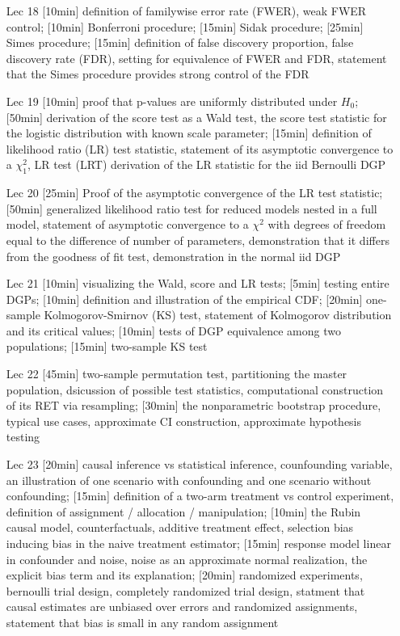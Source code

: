 \begin{enumerate}
\item[Lec 18] [10min] definition of familywise error rate (FWER), weak FWER control; [10min] Bonferroni procedure; [15min] Sidak procedure; [25min] Simes procedure; [15min] definition of false discovery proportion, false discovery rate (FDR), setting for equivalence of FWER and FDR, statement that the Simes procedure provides strong control of the FDR

\item[Lec 19] [10min] proof that p-values are uniformly distributed under $H_0$; [50min] derivation of the score test as a Wald test, the score test statistic for the logistic distribution with known scale parameter; [15min] definition of likelihood ratio (LR) test statistic, statement of its asymptotic convergence to a $\chi^2_1$, LR test (LRT) derivation of the LR statistic for the iid Bernoulli DGP

\item[Lec 20] [25min] Proof of the asymptotic convergence of the LR test statistic; [50min] generalized likelihood ratio test for reduced models nested in a full model, statement of asymptotic convergence to a $\chi^2$ with degrees of freedom equal to the difference of number of parameters, demonstration that it differs from the goodness of fit test, demonstration in the normal iid DGP

\item[Lec 21] [10min] visualizing the Wald, score and LR tests; [5min] testing entire DGPs; [10min] definition and illustration of the empirical CDF; [20min] one-sample Kolmogorov-Smirnov (KS) test, statement of Kolmogorov distribution and its critical values; [10min] tests of DGP equivalence among two populations; [15min] two-sample KS test

\item[Lec 22] [45min] two-sample permutation test, partitioning the master population, dsicussion of possible test statistics, computational construction of its RET via resampling; [30min] the nonparametric bootstrap procedure, typical use cases, approximate CI construction, approximate hypothesis testing

\item[Lec 23] [20min] causal inference vs statistical inference, counfounding variable, an illustration of one scenario with confounding and one scenario without confounding; [15min] definition of a two-arm treatment vs control experiment, definition of assignment / allocation / manipulation; [10min] the Rubin causal model, counterfactuals, additive treatment effect, selection bias inducing bias in the naive treatment estimator; [15min] response model linear in confounder and noise, noise as an approximate normal realization, the explicit bias term and its explanation; [20min] randomized experiments, bernoulli trial design, completely randomized trial design, statment that causal estimates are unbiased over errors and randomized assignments, statement that bias is small in any random assignment

\end{enumerate}

